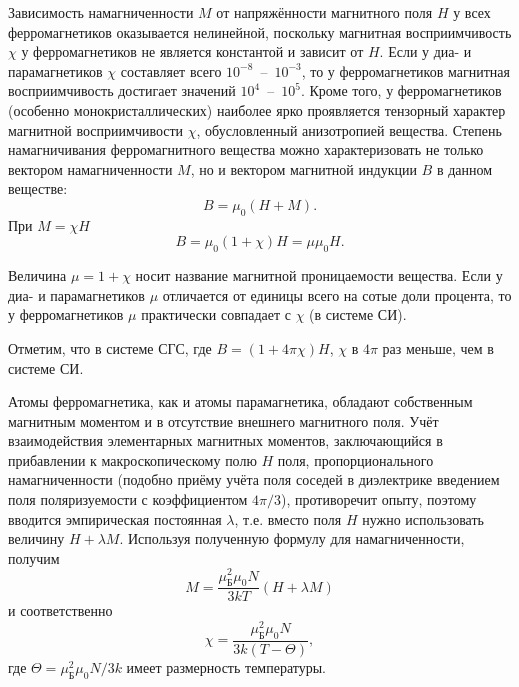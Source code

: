 Зависимость намагниченности $M$ от напряжённости магнитного поля $H$ у всех ферромагнетиков оказывается нелинейной, поскольку магнитная восприимчивость $\chi$ у ферромагнетиков не является константой и зависит от $H$. Если у диа- и парамагнетиков $\chi$ составляет всего $10^{-8}$~--~$10^{-3}$, то у ферромагнетиков магнитная восприимчивость достигает значений $10^4$~--~$10^5$. Кроме того, у ферромагнетиков (особенно монокристаллических) наиболее ярко проявляется тензорный характер магнитной восприимчивости $\chi$, обусловленный анизотропией вещества. Степень намагничивания ферромагнитного вещества можно характеризовать не только вектором намагниченности $M$, но и вектором магнитной индукции $B$ в данном веществе:
\begin{equation*}
	B =\mu_0 (H + M).
\end{equation*}
При $M = \chi H$
\begin{equation}
	B = \mu_0 (1 + \chi)H = \mu \mu_0 H.
\end{equation}

Величина $\mu = 1+ \chi$ носит название магнитной проницаемости вещества. Если у диа- и парамагнетиков $\mu$ отличается от единицы всего на сотые доли процента, то у ферромагнетиков $\mu$ практически совпадает с $\chi$ (в системе СИ).

Отметим, что в системе СГС, где $B = (1 + 4\pi \chi) H$, $\chi$ в $4\pi$ раз меньше, чем в системе СИ.

Атомы ферромагнетика, как и атомы парамагнетика, обладают собственным магнитным моментом и в отсутствие внешнего магнитного поля. Учёт взаимодействия  элементарных магнитных моментов, заключающийся в прибавлении к макроскопическому полю $H$ поля, пропорционального намагниченности (подобно приёму учёта поля соседей в диэлектрике введением поля поляризуемости с коэффициентом $4\pi/3$), противоречит опыту, поэтому вводится эмпирическая постоянная $\lambda$, т.е. вместо поля $H$ нужно использовать величину $H + \lambda M$.  Используя полученную формулу для намагниченности, получим
\begin{equation*}
	M = \frac{\mu_{\text{Б}}^2 \mu_0 N}{3kT}(H + \lambda M)
\end{equation*}
и соответственно
\begin{equation*}
	\chi = \frac{\mu_{\text{Б}}^2 \mu_0 N}{3k(T - \Theta)},
\end{equation*}
где $\Theta = \mu_{\text{Б}}^2 \mu_0 N / 3k$ имеет размерность температуры.

